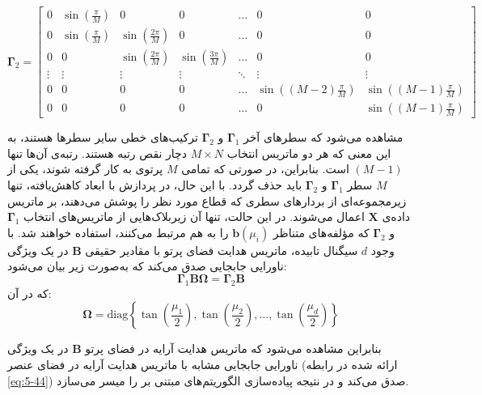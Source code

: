 \begin{equation*}
	\bm{\Gamma}_2 = \begin{bmatrix}
		0 & \sin\left(\frac{\pi}{M}\right) & 0 & 0 & \dots & 0 & 0 \\
		0 & \sin\left(\frac{\pi}{M}\right) & \sin\left(\frac{2\pi}{M}\right) & 0 & \dots & 0 & 0 \\
		0 & 0 & \sin\left(\frac{2\pi}{M}\right) & \sin\left(\frac{3\pi}{M}\right) & \dots & 0 & 0 \\
		\vdots & \vdots & \vdots & \vdots & \ddots & \vdots & \vdots \\
		0 & 0 & 0 & 0 & \dots & \sin\left((M-2)\frac{\pi}{M}\right) & \sin\left((M-1)\frac{\pi}{M}\right) \\
		0 & 0 & 0 & 0 & \dots & 0 & \sin\left((M-1)\frac{\pi}{M}\right)
	\end{bmatrix}
\end{equation*}



مشاهده می‌شود که سطرهای آخر $\bm{\Gamma}_1$ و $\bm{\Gamma}_2$ ترکیب‌های خطی سایر سطرها هستند، به این معنی که هر دو ماتریس انتخاب $M \times N$ دچار نقص رتبه هستند. رتبه‌ی آن‌ها تنها $(M - 1)$ است. بنابراین، در صورتی که تمامی $M$ پرتوی  به کار گرفته شوند، یکی از $M$ سطر $\bm{\Gamma}_1$ و $\bm{\Gamma}_2$ باید حذف گردد. با این حال، در پردازش با ابعاد کاهش‌یافته، تنها زیرمجموعه‌ای از بردارهای سطری که قطاع  مورد نظر را پوشش می‌دهند، بر ماتریس داده‌ی $\bm{X}$ اعمال می‌شوند. در این حالت، تنها آن زیربلاک‌هایی از ماتریس‌های انتخاب $\bm{\Gamma}_1$ و $\bm{\Gamma}_2$ که مؤلفه‌های متناظر $\bm{b}(\mu_i)$ را به هم مرتبط می‌کنند، استفاده خواهند شد. با وجود $d$ سیگنال تابیده، ماتریس هدایت فضای پرتو  با مقادیر حقیقی $\bm{B}$ در یک ویژگی ناورایی جابجایی صدق می‌کند که به‌صورت زیر بیان می‌شود:
\begin{equation*}
	\bm{\Gamma}_1 \bm{B} \bm{\Omega} = \bm{\Gamma}_2 \bm{B}
\end{equation*}
که در آن:
\begin{equation}
	\bm{\Omega} = \text{diag} \left\{ \tan \left( \frac{\mu_1}{2} \right), \tan \left( \frac{\mu_2}{2} \right), \dots, \tan \left( \frac{\mu_d}{2} \right) \right\}
	\label{eq:5-80}
\end{equation}

بنابراین مشاهده می‌شود که ماتریس هدایت آرایه در فضای پرتو $\bm{B}$ در یک ویژگی ناورایی جابجایی مشابه با ماتریس هدایت آرایه در فضای عنصر (ارائه شده در رابطه \eqref{eq:5-44}) صدق می‌کند و در نتیجه پیاده‌سازی الگوریتم‌های مبتنی بر  را میسر می‌سازد.


